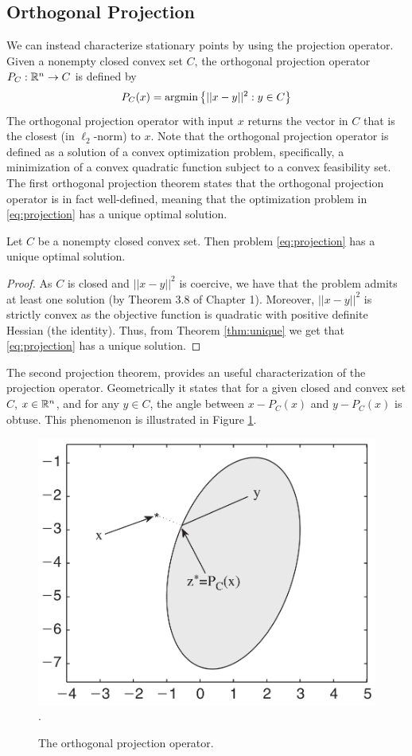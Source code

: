 \documentclass[10pt,a4paper]{article}
\begin{document}
\subsection{Orthogonal Projection}
We can instead characterize stationary points by using the projection operator.
Given a nonempty closed convex set $C$, the orthogonal projection operator $P_C:\mathbb{R}^n \to C$ is defined by 
\begin{equation}\label{eq:projection}
	P_C(x) = \operatorname*{argmin}\left\{||x-y||^2: y\in C\right\}
\end{equation}
The orthogonal projection operator with input $x$ returns the vector in $C$ that is the closest (in $\ell_2$-norm)
to $x$. Note that the orthogonal projection operator is defined as a solution of a convex
optimization problem, specifically, a minimization of a convex quadratic function subject to a convex feasibility set. The first orthogonal projection theorem states that the orthogonal projection operator is in fact well-defined, meaning that the optimization problem in \eqref{eq:projection} has a unique optimal solution.
\begin{theorem}
	Let $C$ be a nonempty closed convex set. Then problem \eqref{eq:projection} has a unique optimal solution.
\end{theorem}
\begin{proof}
	As $C$ is closed and $||x-y||^2$ is coercive, we have that the problem admits at least one solution (by Theorem 3.8 of Chapter 1). Moreover, $||x-y||^2$ is strictly convex as the objective function is quadratic with
	positive definite Hessian (the identity). Thus, from Theorem \ref{thm:unique} we get that \eqref{eq:projection} has a unique solution.
\end{proof}
The second projection theorem, provides an useful characterization of the projection operator. Geometrically it states that for a given closed and convex set $C$, $x \in \mathbb{R}^n$, and for any $y\in C$, the angle between $x-P_C (x)$ and $y-P_C (x)$ is obtuse.
This phenomenon is illustrated in Figure \ref{fig:second_projection}.
\begin{figure}
	\centering
	\includegraphics[width=0.5\linewidth]{second_projection}.
	\caption{The orthogonal projection operator.} \label{fig:second_projection}
\end{figure}
\end{document}
